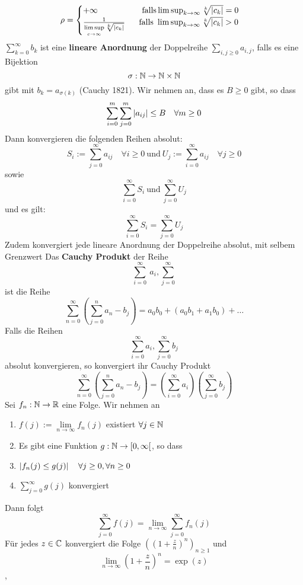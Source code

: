     \[\rho = \begin{cases}
        +\infty \quad \quad \quad \quad \quad \  \text{falls} \limsup_{k \rightarrow \infty} \sqrt[k]{\left\lvert c_k \right\rvert} = 0 \\
        \frac{1}{\limsup\limits_{c \rightarrow \infty} \sqrt[k]{\left|c_{k}\right|}}  \quad \  \ \text{falls } \limsup_{k \rightarrow \infty} \sqrt[k]{\left\lvert c_k \right\rvert} > 0
        \end{cases}\]
\Def[2.58] \(\sum_{k=0}^{\infty} b_k \) ist eine \textbf{lineare Anordnung} der Doppelreihe \(\sum_{i,j \geq 0} a_{i,j}\), falls es eine Bijektion \[\sigma : \mathbb{N} \rightarrow \mathbb{N} \times \mathbb{N} \] gibt mit \(b_k = a_{\sigma(k)}\) \newline
\Satz[2.59] (Cauchy 1821). Wir nehmen an, dass es \(B \geq 0\) gibt, so dass
\[\sum_{i=0}^{m}\sum_{j=0}^{m}\left\lvert a_{ij} \right\rvert \leq B \quad \forall m \geq 0\]
Dann konvergieren die folgenden Reihen absolut:
\[S_i := \sum_{j=0}^\infty a_{ij} \quad \forall i \geq 0 \  \text{und} \  U_j := \sum_{i=0}^{\infty}a_{ij} \quad \forall j \geq 0\]
sowie
\[\sum_{i=0}^\infty S_i \ \text{und} \ \sum_{j=0}^\infty U_j\]
und es gilt:
\[\sum_{i=0}^\infty S_i  =  \sum_{j=0}^\infty U_j\]
Zudem konvergiert jede lineare Anordnung der Doppelreihe absolut, mit selbem Grenzwert
 Das \textbf{Cauchy Produkt} der Reihe
\[\sum_{i=0}^\infty\ a_i, \sum_{j=0}^\infty\]
ist die Reihe
\[\sum_{n=0}^\infty ( \sum_{j=0}^n a_n-b_j )= a_0b_0 + (a_0b_1 + a_1b_0) + \dots \]
 Falls die Reihen
\[\sum_{i=0}^\infty a_i , \sum_{j=0}^\infty b_j\]
absolut konvergieren, so konvergiert ihr Cauchy Produkt
\[\sum_{n=0}^{\infty} (\sum_{j=0}^n a_n-b_j) = (\sum_{i=0}^{\infty} a_i) (\sum_{j=0}^{\infty} b_j)\]
  Sei \( f_n : \mathbb{N} \rightarrow \mathbb{R} \) eine Folge. Wir nehmen an
\begin{enumerate}
    \item [1] \(f(j) := \lim\limits_{n \rightarrow \infty} f_n(j)\) existiert \(\forall j \in \mathbb{N}\)
    \item [2] Es gibt eine Funktion \(g: \mathbb{N} \rightarrow [0, \infty[\), so dass
    \item [2.1] \(\left\lvert f_n(j) \leq g(j) \right\rvert \quad \forall j \geq 0, \forall n \geq 0\)
    \item [2.2] \(\sum_{j=0}^\infty g(j)\) konvergiert
\end{enumerate}
Dann folgt
\[\sum_{j=0}^\infty f(j) = \lim\limits_{n \rightarrow \infty} \sum_{j=0}^\infty f_n(j)\]
 Für jedes \(z \in \mathbb{C} \) konvergiert die Folge \(((1 + \frac{z}{n})^n)_{n \geq 1}\) und
\[\lim\limits_{n \rightarrow \infty} (1 + \frac{z}{n})^n = \exp(z)\]
\sep